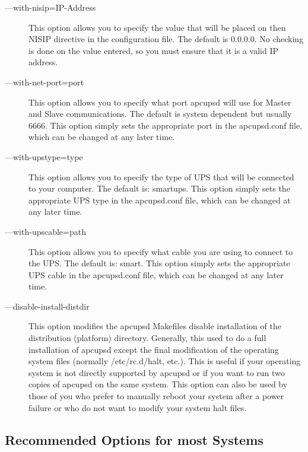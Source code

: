 \begin{description}
\item [{---}with-nisip=\lt{}IP-Address\gt{}]
   This option allows you to specify the value that will be placed on then NISIP
directive in the configuration file. The default is 0.0.0.0. No checking is
done on the value entered, so you must ensure that it is a valid IP address.  

\item [{---}with-net-port=\lt{}port\gt{}]
   This option allows you to specify what port apcupsd will use for Master and
Slave communications. The default is system dependent but usually 6666. This
option simply sets the appropriate port in the apcupsd.conf file, which can be
changed at any later time.  

\item [{---}with-upstype=\lt{}type\gt{}]
   This option allows you to specify the type of UPS that will be connected to
your computer. The default is: smartups. This option simply sets the
appropriate UPS type in the apcupsd.conf file, which can be changed at any
later time.  

\item [{---}with-upscable=\lt{}path\gt{}]
   This option allows you to specify what cable you are using to connect to the
UPS. The default is: smart. This option simply sets the appropriate UPS cable
in the apcupsd.conf file, which can be changed at any later time.  

\item [{---}disable-install-distdir]
   This option modifies the apcupsd Makefiles disable installation of the
distribution (platform) directory. Generally, this used to do a full
installation of apcupsd except the final modification of the operating system
files (normally /etc/rc.d/halt, etc.). This is useful if your operating system
is not directly supported by apcupsd or if you want to run two copies of
apcupsd on the same system. This option can also be used by those of you who
prefer to manually reboot your system after a power failure or who do not want
to modify your system halt files. 
\end{description}

\label{Recommended-Options-for-most-Systems}

\subsection*{Recommended Options for most Systems}

